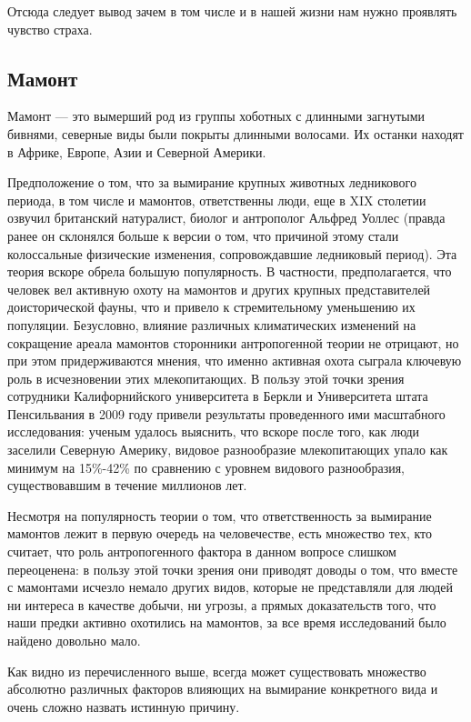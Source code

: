 \documentclass[12pt]{article}
\begin{document}
    Отсюда следует вывод зачем в том числе и в нашей жизни нам нужно проявлять чувство страха.

    \subsection{Мамонт}

    Мамонт --- это вымерший род из группы хоботных с длинными загнутыми бивнями, северные виды были покрыты длинными волосами. Их останки находят в Африке, Европе, Азии и Северной Америки.

    Предположение о том, что за вымирание крупных животных ледникового периода, в том числе и мамонтов, ответственны люди, еще в XIX столетии озвучил британский натуралист, биолог и антрополог Альфред Уоллес (правда ранее он склонялся больше к версии о том, что причиной этому стали колоссальные физические изменения, сопровождавшие ледниковый период). Эта теория вскоре обрела большую популярность. В частности, предполагается, что человек вел активную охоту на мамонтов и других крупных представителей доисторической фауны, что и привело к стремительному уменьшению их популяции. Безусловно, влияние различных климатических изменений на сокращение ареала мамонтов сторонники антропогенной теории не отрицают, но при этом придерживаются мнения, что именно активная охота сыграла ключевую роль в исчезновении этих млекопитающих. В пользу этой точки зрения сотрудники Калифорнийского университета в Беркли и Университета штата Пенсильвания в 2009 году привели результаты проведенного ими масштабного исследования: ученым удалось выяснить, что вскоре после того, как люди заселили Северную Америку, видовое разнообразие млекопитающих упало как минимум на 15\%-42\% по сравнению с уровнем видового разнообразия, существовавшим в течение миллионов лет.

    Несмотря на популярность теории о том, что ответственность за вымирание мамонтов лежит в первую очередь на человечестве, есть множество тех, кто считает, что роль антропогенного фактора в данном вопросе слишком переоценена: в пользу этой точки зрения они приводят доводы о том, что вместе с мамонтами исчезло немало других видов, которые не представляли для людей ни интереса в качестве добычи, ни угрозы, а прямых доказательств того, что наши предки активно охотились на мамонтов, за все время исследований было найдено довольно мало.

    Как видно из перечисленного выше, всегда может существовать множество абсолютно различных факторов влияющих на вымирание конкретного вида и очень сложно назвать истинную причину.
\end{document}
